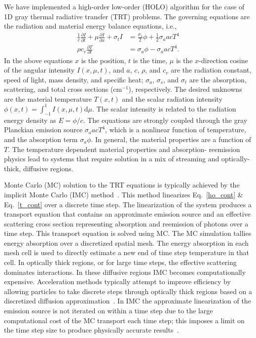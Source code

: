 \documentclass{mc2013}
\newcommand{\pderiv}[2]{\frac{\partial #1}{\partial #2}}
\renewcommand{\d}{\mathrm{d}}
\begin{document}
We have implemented a high-order low-order (HOLO) algorithm for the case of 1D gray thermal radiative transfer (TRT) problems. The governing equations are the radiation and
material energy balance equations, i.e.,\vspace{-0.05in}
\begin{align}\label{ho_cont}
    \frac{1}{c}\pderiv{I}{t} + \mu \pderiv{I}{x} + \sigma_t I
&= \frac{\sigma_s}{2} \phi +\frac{1}{2} \sigma_a a c T^4
    \\ \label{t_cont}
  \rho c_v \pderiv{T}{t} &=  \sigma_a \phi - \sigma_a a c T^4.
\end{align}
In the above equations $x$ is the position, $t$ is the time, $\mu$ is
the $x$-direction cosine of the angular intensity $I(x,\mu,t)$, and $a$, $c$, $\rho$,
and
$c_v$ are the radiation constant, speed of light, mass density, and specific heat; $\sigma_a$, $\sigma_s$, and
$\sigma_t$ are the absorption, scattering, and total
cross sections (cm$^{-1}$), respectively. The desired unknowns are the material
temperature $T(x,t)$ and the scalar radiation intensity $\phi(x,t)=\int_{-1}^1
I(x,\mu,t) \d \mu$.  The scalar intensity is related to the radiation energy density
as $E = \phi/c$.  The equations are
strongly coupled through the gray Planckian emission source $\sigma_a a c T^4$, which
is a nonlinear function of temperature, and the absorption
term $\sigma_a \phi$.   In general, the material properties are a function of $T$.  The temperature dependent material properties and
absorption- reemission physics lead to systems that require solution in a mix of
streaming and optically-thick, diffusive regions. 

Monte Carlo (MC) solution to the TRT equations is typically achieved by the 
implicit Monte Carlo (IMC) method~\cite{fnc}. This
method linearizes Eq.~\eqref{ho_cont} \& Eq.~\eqref{t_cont} over a discrete time
step.  The linearization of the system produces a transport equation that contains an approximate emission source and an effective scattering cross section representing
absorption and reemission of photons over a time step. This transport equation is solved using MC. The MC simulation tallies energy absorption
over a discretized spatial mesh.  The energy absorption in each mesh cell is used to directly estimate
a new end of time step temperature in that cell.  In optically thick regions, or for
large time steps, the
effective scattering dominates interactions.  In these diffusive regions IMC
becomes computationally expensive. Acceleration methods typically attempt to improve
efficiency by allowing particles to take discrete steps through optically thick
regions based on a discretized diffusion approximation~\cite{imd,ddmc}. In IMC the
approximate linearization of the emission source is not iterated on within a time
step due to the large computational cost of the MC transport each time step; this
imposes a limit on the time step size to produce physically accurate
results~\cite{wollaber2013discrete}. 
\end{document}
